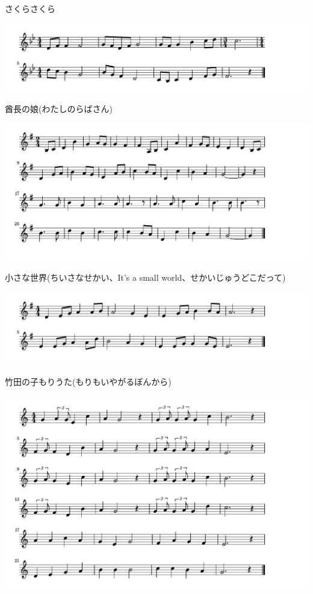\documentclass[a4paper]{ltjsarticle}
\begin{document}
\vspace{-10mm} \hspace{10mm}
さくらさくら



\includegraphics[clip]{shuchou_crop.pdf}

\vspace{-10mm} \hspace{10mm}
酋長の娘(わたしのらばさん)




\includegraphics[clip]{smallworld_crop.pdf}

\vspace{-10mm} \hspace{10mm}
小さな世界(ちいさなせかい、It's a small world、せかいじゅうどこだって)



\includegraphics[clip]{takedanokomori_crop.pdf}

\vspace{-10mm} \hspace{10mm}
竹田の子もりうた(もりもいやがるぼんから)



\includegraphics[clip]{tonakai_crop.pdf}
\end{document}
